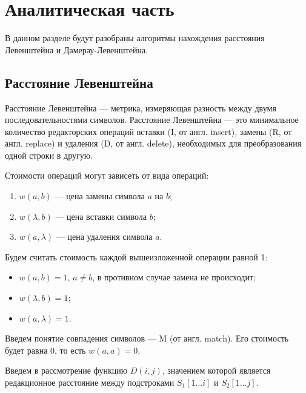 \chapter{Аналитическая часть}

В данном разделе будут разобраны алгоритмы нахождения расстояния Левенштейна и Дамерау-Левенштейна.

\section{Расстояние Левенштейна}

Расстояние Левенштейна --- метрика, измеряющая разность между двумя последовательностями символов. Расстояние Левенштейна --- это минимальное количество редакторских операций вставки (I, от англ. insert), замены (R, от англ. replace) и удаления (D, от англ. delete), необходимых для преобразования одной строки в другую\cite{levenshtein}. 

Стоимости операций могут зависеть от вида операций:
\begin{enumerate}[label=\arabic*)]
	\item $w(a, b)$ --- цена замены символа $a$ на $b$;
	\item $w(\lambda, b)$ --- цена вставки символа $b$;
	\item $w(a, \lambda)$ --- цена удаления символа $a$.
\end{enumerate}

Будем считать стоимость каждой вышеизложенной операции равной 1:
\begin{itemize}[label=---]
	\item $w(a, b) = 1$, $a \neq b$, в противном случае замена не происходит;
	\item $w(\lambda, b) = 1$;
	\item $w(a, \lambda) = 1$.
\end{itemize}

Введем понятие совпадения символов --- M (от англ. match). Его стоимость будет равна 0, то есть $w(a, a) = 0$.

Введем в рассмотрение функцию $D(i, j)$, значением которой является
редакционное расстояние между подстроками $S_1[1...i]$ и $S_2[1...j]$.

